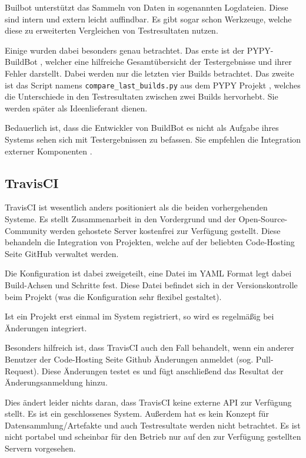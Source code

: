 Builbot unterst\"utzt das Sammeln von Daten in sogenannten Logdateien.
Diese sind intern und extern leicht auffindbar.
Es gibt sogar schon Werkzeuge, welche diese zu erweiterten Vergleichen von Testresultaten nutzen.

Einige wurden dabei besonders genau betrachtet.
Das erste ist der PYPY-BuildBot \cite{pypy:overview}, welcher eine hilfreiche Gesamtübersicht der Testergebnisse und ihrer Fehler darstellt.
Dabei werden nur die letzten vier Builds betrachtet.
Das zweite ist das Script namens \verb|compare_last_builds.py|
aus dem PYPY Projekt \cite{pypy:diffscript} ,
welches die Unterschiede in den Testresultaten zwischen zwei Builds hervorhebt.
Sie werden sp\"ater als Ideenlieferant dienen.

Bedauerlich ist, dass die Entwickler von BuildBot es nicht als Aufgabe ihres Systems sehen
sich mit Testergebnissen zu befassen.
Sie empfehlen die Integration externer Komponenten \cite{buildbot:irc}.

\subsection{TravisCI}


TravisCI \cite{travisci:website} ist wesentlich anders positioniert als die beiden vorhergehenden Systeme.
Es stellt Zusammenarbeit in den Vordergrund und der Open-Source-Community werden gehostete Server
kostenfrei zur Verf\"ugung gestellt.
Diese behandeln die Integration von Projekten,
welche auf der beliebten Code-Hosting Seite GitHub verwaltet werden.

Die Konfiguration ist dabei zweigeteilt,
eine Datei im \ac{YAML} Format \cite{yaml:website} legt dabei Build-Achsen und Schritte fest.
Diese Datei befindet sich in der Versionskontrolle beim Projekt
(was die Konfiguration sehr flexibel gestaltet).

Ist ein Projekt erst einmal im System registriert,
so wird es regelmäßig bei Änderungen integriert.

Besonders hilfreich ist, dass TravisCI auch den Fall behandelt,
wenn ein anderer Benutzer der Code-Hosting Seite Github \"Anderungen anmeldet
\cite{github:pullreq} (sog. Pull-Request).
Diese Änderungen testet es und f\"ugt anschließend das Resultat der \"Anderungsanmeldung hinzu.

Dies \"andert leider nichts daran, dass TravisCI keine externe API zur Verfügung stellt.
Es ist ein geschlossenes System. Außerdem hat es kein Konzept f\"ur Datensammlung/Artefakte
und auch Testresultate werden nicht betrachtet.
Es ist nicht portabel und scheinbar f\"ur den Betrieb nur
auf den zur Verfügung gestellten Servern vorgesehen.


